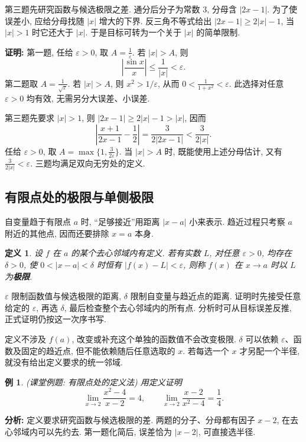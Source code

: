 \documentclass[UTF8,openany]{ctexbook}
\theoremstyle{chinesetextbook}
\newtheorem{definition}{定义}[section]
\newtheorem{example}{例}[section]
\newenvironment{cnproof}{\par\indent\textbf{证明:} \ignorespaces}{\par}
\begin{document}
第三题先研究函数与候选极限之差. 通分后分子为常数 $3$, 分母含 $|2x-1|$. 为了使误差小, 应给分母找随 $|x|$ 增大的下界. 反三角不等式给出 $|2x-1|\ge2|x|-1$, 当 $|x|>1$ 时它还大于 $|x|$. 于是目标可转为一个关于 $|x|$ 的简单限制.
\begin{cnproof}
第一题, 任给 $\varepsilon>0$, 取 $\displaystyle A=\frac1\varepsilon$. 若 $|x|>A$, 则
\[
\left|\frac{\sin x}{x}\right|\le\frac1{|x|}<\varepsilon.
\]
第二题取 $\displaystyle A=\frac1{\sqrt\varepsilon}$. 若 $|x|>A$, 则 $x^2>1/\varepsilon$, 从而 $\displaystyle0<\frac1{1+x^2}<\varepsilon$. 此选择对任意 $\varepsilon>0$ 均有效, 无需另分大误差、小误差.

第三题先要求 $|x|>1$, 则 $|2x-1|\ge2|x|-1>|x|$, 因而
\[
\left|\frac{x+1}{2x-1}-\frac12\right|
=\frac3{2|2x-1|}<\frac3{2|x|}.
\]
任给 $\varepsilon>0$, 取 $\displaystyle A=\max\{1,\frac3{2\varepsilon}\}$. 当 $|x|>A$ 时, 既能使用上述分母估计, 又有 $\displaystyle\frac3{2|x|}<\varepsilon$. 三题均满足双向无穷处的定义.
\end{cnproof}

\subsection{有限点处的极限与单侧极限}
自变量趋于有限点 $a$ 时, “足够接近”用距离 $|x-a|$ 小来表示. 趋近过程只考察 $a$ 附近的其他点, 因而还要排除 $x=a$ 本身.
\begin{definition}
设 $f$ 在 $a$ 的某个去心邻域内有定义. 若有实数 $L$, 对任意 $\varepsilon>0$, 均存在 $\delta>0$, 使 $0<|x-a|<\delta$ 时恒有 $|f(x)-L|<\varepsilon$, 则称 $f(x)$ 在 $x\to a$ 时以 $L$ 为\textbf{极限}.
\end{definition}
$\varepsilon$ 限制函数值与候选极限的距离, $\delta$ 限制自变量与趋近点的距离. 证明时先接受任意给定的 $\varepsilon$, 再选 $\delta$, 最后检查整个去心邻域内的所有点. 分析时可从目标误差反推, 正式证明仍按这一次序书写.

定义不涉及 $f(a)$, 改变或补充这个单独的函数值不会改变极限. $\delta$ 可以依赖 $\varepsilon$、函数及固定的趋近点, 但不能依赖随后任意选取的 $x$. 若每选一个 $x$ 才另配一个半径, 就没有给出定义要求的统一邻域.
\begin{example}
(课堂例题: 有限点处的定义法) 用定义证明
\[
\lim_{x\to2}\frac{x^2-4}{x-2}=4,\qquad
\lim_{x\to2}\frac{x-2}{x^2-4}=\frac14.
\]
\end{example}
\par\indent\textbf{分析:} 定义要求研究函数与候选极限的差. 两题的分子、分母都有因子 $x-2$, 在去心邻域内可以先约去. 第一题化简后, 误差恰为 $|x-2|$, 可直接选半径.
\end{document}
